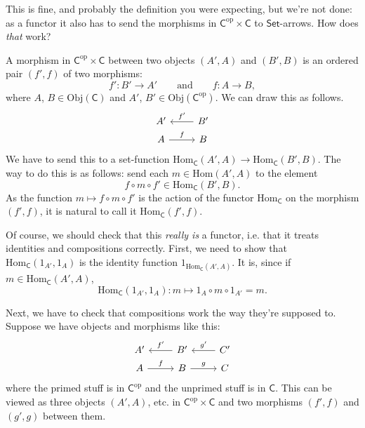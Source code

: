 \documentclass[a4paper]{report}
\newcommand{\Obj}{\mathrm{Obj}}
\newcommand{\Hom}{\mathrm{Hom}}
\theoremstyle{definition}
\theoremstyle{plain}
\theoremstyle{remark}
\begin{document}
This is fine, and probably the definition you were expecting, but we're not done: as a functor it also has to send the morphisms in $\mathsf{C}^{\mathrm{op}} \times \mathsf{C}$ to $\mathsf{Set}$-arrows. How does \emph{that} work?

A morphism in $\mathsf{C}^{\text{op}} \times \mathsf{C}$ between two objects $(A', A)$ and $(B', B)$ is an ordered pair $(f', f)$ of two morphisms:
\begin{equation*}
  f'\colon B' \to A'\qquad\text{and}\qquad f\colon A \to B,
\end{equation*}
where $A$, $B \in \Obj(\mathsf{C})$ and $A'$, $B' \in \Obj(\mathsf{C}^{\mathrm{op}})$. We can draw this as follows.
\begin{equation*}
  \begin{tikzcd}[row sep=tiny]
    A' 
    & B'
    \arrow[l, swap, "f'"]
    \\
    A
    \arrow[r, "f"]
    & B
  \end{tikzcd}
\end{equation*}
We have to send this to a set-function $\Hom_{\mathsf{C}}(A', A) \to \Hom_{\mathsf{C}}(B', B)$. The way to do this is as follows: send each $m \in \Hom(A', A)$ to the element
\begin{equation*}
  f \circ m \circ f' \in \Hom_{\mathsf{C}}(B', B).
\end{equation*}
As the function $m \mapsto f \circ m \circ f'$ is the action of the functor $\Hom_{\mathsf{C}}$ on the morphism $(f', f)$, it is natural to call it $\mathrm{Hom}_{\mathsf{C}}(f', f)$.

Of course, we should check that this \emph{really is} a functor, i.e. that it treats identities and compositions correctly. First, we need to show that $\Hom_{\mathsf{C}}(1_{A'}, 1_{A})$ is the identity function $1_{\Hom_{\mathsf{C}}(A', A)}$. It is, since if $m \in \Hom_{\mathsf{C}}(A', A)$,
\begin{equation*}
  \Hom_{\mathsf{C}}(1_{A'}, 1_{A})\colon m \mapsto 1_{A} \circ m \circ 1_{A'} = m.
\end{equation*}

Next, we have to check that compositions work the way they're supposed to. Suppose we have objects and morphisms like this:
\begin{equation*}
  \begin{tikzcd}[row sep=tiny]
    A'
    & B'
    \arrow[l, swap, "f'"]
    & C'
    \arrow[l, swap, "g'"]
    \\
    A
    \arrow[r, "f"]
    & B
    \arrow[r, "g"]
    & C
  \end{tikzcd}
\end{equation*}
where the primed stuff is in $\mathsf{C}^{\mathrm{op}}$ and the unprimed stuff is in $\mathsf{C}$. This can be viewed as three objects $(A', A)$, etc. in $\mathsf{C}^{\mathrm{op}} \times \mathsf{C}$ and two morphisms  $(f', f)$ and $(g', g)$ between them.
\end{document}
